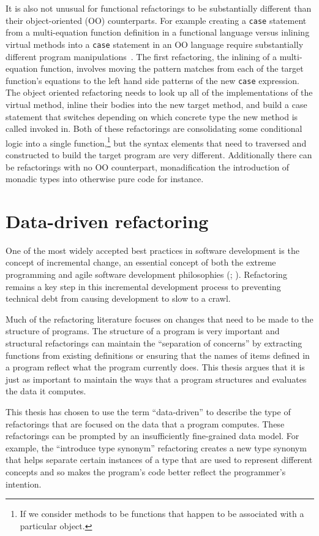 It is also not unusual for functional refactorings to be substantially different than their object-oriented (OO) counterparts. For example creating a \texttt{case} statement from a multi-equation function definition in a functional language versus inlining virtual methods into a \texttt{case} statement in an OO language require substantially different program manipulations~\citep{huiqingThesis}. The first refactoring, the inlining of a multi-equation function, involves moving the pattern matches from each of the target function's equations to the left hand side patterns of the new \texttt{case} expression. The object oriented refactoring needs to look up all of the implementations of the virtual method, inline their bodies into the new target method, and build a case statement that switches depending on which concrete type the new method is called invoked in. Both of these refactorings are consolidating some conditional logic into a single function,\footnote{If we consider methods to be functions that happen to be associated with a particular object.} but the syntax elements that need to traversed and constructed to build the target program are very different. Additionally there can be refactorings with no OO counterpart, monadification the introduction of monadic types into otherwise pure code for instance.

\section{Data-driven refactoring}

One of the most widely accepted best practices in software development is the concept of incremental change, an essential concept of both the extreme programming and agile software development philosophies (\cite{extremeProg}; \cite{agileManifesto}). Refactoring remains a key step in this incremental development process to preventing technical debt from causing development to slow to a crawl.

Much of the refactoring literature focuses on changes that need to be made to the structure of programs. The structure of a program is very important and structural refactorings can maintain the ``separation of concerns'' by extracting functions from existing definitions or ensuring that the names of items defined in a program reflect what the program currently does. This thesis argues that it is just as important to maintain the ways that a program structures and evaluates the data it computes.

This thesis has chosen to use the term ``data-driven'' to describe the type of refactorings that are focused on the data that a program computes. These refactorings can be prompted by an insufficiently fine-grained data model. For example, the ``introduce type synonym'' refactoring creates a new type synonym that helps separate certain instances of a type that are used to represent different concepts and so makes the program's code better reflect the programmer's intention.

